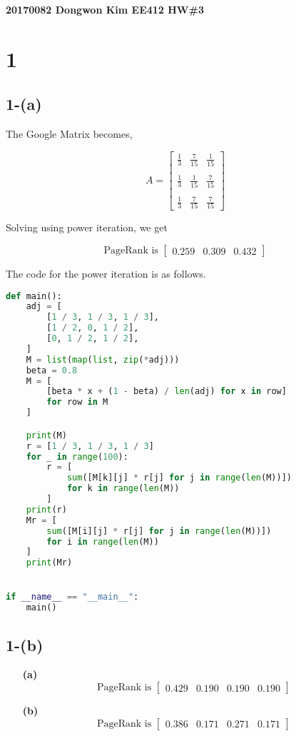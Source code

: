 \documentclass{article}
\begin{document}
\noindent
\textbf{20170082 Dongwon Kim EE412 HW\#3}\\

\noindent
\section*{1}
\subsection*{1-(a)}

The Google Matrix becomes,

\[
A = \begin{bmatrix}
    \frac{1}{3} & \frac{7}{15} & \frac{1}{15} \\ \\
    \frac{1}{3} & \frac{1}{15} & \frac{7}{15} \\ \\
    \frac{1}{3} & \frac{7}{15} & \frac{7}{15}          
\end{bmatrix}
\]

\noindent
Solving using power iteration, we get

\[
\text{PageRank is } \begin{bmatrix} 0.259 & 0.309 & 0.432 \end{bmatrix}
\]

\noindent
The code for the power iteration is as follows.

\begin{lstlisting}[language=Python]
def main():
    adj = [
        [1 / 3, 1 / 3, 1 / 3],
        [1 / 2, 0, 1 / 2],
        [0, 1 / 2, 1 / 2],
    ]
    M = list(map(list, zip(*adj)))
    beta = 0.8
    M = [
        [beta * x + (1 - beta) / len(adj) for x in row]
        for row in M
    ]

    print(M)
    r = [1 / 3, 1 / 3, 1 / 3]
    for _ in range(100):
        r = [
            sum([M[k][j] * r[j] for j in range(len(M))])
            for k in range(len(M))
        ]
    print(r)
    Mr = [
        sum([M[i][j] * r[j] for j in range(len(M))])
        for i in range(len(M))
    ]
    print(Mr)


if __name__ == "__main__":
    main()
\end{lstlisting}


\subsection*{1-(b)}
\begin{enumerate}
    \item [\textbf{(a)}] \[
        \text{PageRank is } \begin{bmatrix} 0.429 & 0.190 & 0.190 & 0.190 \end{bmatrix}
        \]
    \item[\textbf{(b)}] \[
        \text{PageRank is } \begin{bmatrix} 0.386 & 0.171 & 0.271 & 0.171 \end{bmatrix}
        \]
\end{enumerate}
\end{document}
